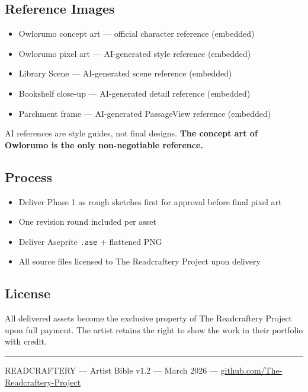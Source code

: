 \documentclass[11pt, a4paper]{article}
\begin{document}
\subsection{Reference Images}
\begin{itemize}[leftmargin=1.5em, itemsep=2pt]
  \item Owlorumo concept art --- official character reference (embedded)
  \item Owlorumo pixel art --- AI-generated style reference (embedded)
  \item Library Scene --- AI-generated scene reference (embedded)
  \item Bookshelf close-up --- AI-generated detail reference (embedded)
  \item Parchment frame --- AI-generated PassageView reference (embedded)
\end{itemize}

\begin{notebox}
  AI references are style guides, not final designs.
  \textbf{The concept art of Owlorumo is the only non-negotiable reference.}
\end{notebox}

\subsection{Process}
\begin{itemize}[leftmargin=1.5em, itemsep=2pt]
  \item Deliver Phase 1 as rough sketches first for approval before final pixel art
  \item One revision round included per asset
  \item Deliver Aseprite \texttt{.ase} + flattened PNG
  \item All source files licensed to The Readcraftery Project upon delivery
\end{itemize}

\subsection{License}

All delivered assets become the exclusive property of The Readcraftery Project upon
full payment. The artist retains the right to show the work in their portfolio with credit.

\vspace{1cm}
\hrule
\vspace{6pt}
\begin{center}
  {\small\sffamily\color{neutralcol}
    READCRAFTERY --- Artist Bible v1.2 --- March 2026 ---
    \href{https://github.com/The-Readcraftery-Project}{github.com/The-Readcraftery-Project}
  }
\end{center}
\end{document}
